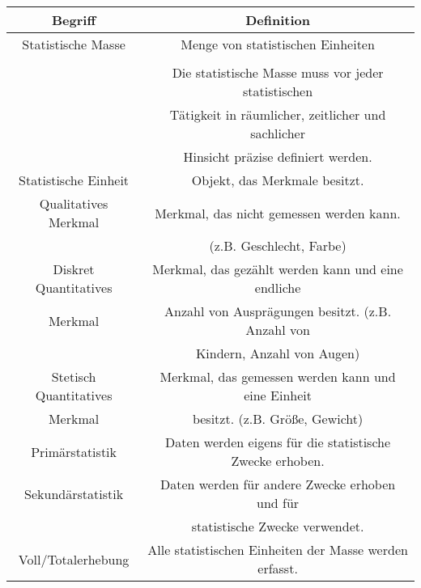 \documentclass[12pt]{scrartcl}
\begin{document}
\begin{table}[h]
    \begin{tabular}{ | c | c | }
        \hline
        Begriff                & Definition                                                \\
        \hline
        \hline
        Statistische Masse     & Menge von statistischen Einheiten                         \\&\\
                               & Die statistische Masse muss vor jeder statistischen       \\
                               & Tätigkeit in räumlicher, zeitlicher und sachlicher        \\
                               & Hinsicht präzise definiert werden.                        \\
        \hline
        Statistische Einheit   & Objekt, das Merkmale besitzt.                             \\
        \hline
        Qualitatives Merkmal   & Merkmal, das nicht gemessen werden kann.                  \\
                               & (z.B. Geschlecht, Farbe)                                  \\
        \hline
        Diskret Quantitatives  & Merkmal, das gezählt werden kann und eine endliche        \\
        Merkmal                & Anzahl von Ausprägungen besitzt. (z.B. Anzahl von         \\
                               & Kindern, Anzahl von Augen)                                \\
        \hline
        Stetisch Quantitatives & Merkmal, das gemessen werden kann und eine Einheit        \\
        Merkmal                & besitzt. (z.B. Größe, Gewicht)                            \\
        \hline
        Primärstatistik        & Daten werden eigens für die statistische Zwecke erhoben.  \\
        \hline
        Sekundärstatistik      & Daten werden für andere Zwecke erhoben und für            \\
                               & statistische Zwecke verwendet.                            \\
        \hline
        Voll/Totalerhebung     & Alle statistischen Einheiten der Masse werden erfasst.    \\

\end{tabular}
\end{table}
\end{document}
